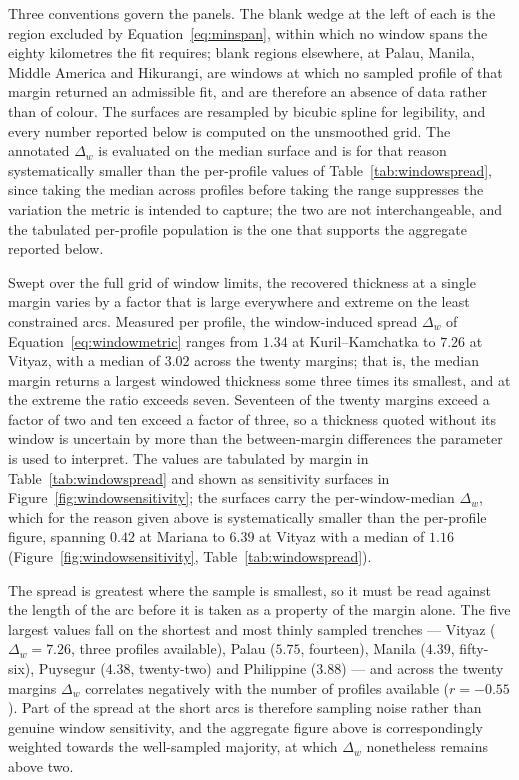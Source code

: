 \documentclass[final]{agujournal2019}
\begin{document}
Three conventions govern the panels. The blank wedge at the left of each is the
region excluded by Equation~\eqref{eq:minspan}, within which no window spans
the eighty kilometres the fit requires; blank regions elsewhere, at Palau,
Manila, Middle America and Hikurangi, are windows at which no sampled profile
of that margin returned an admissible fit, and are therefore an absence of data
rather than of colour. The surfaces are resampled by bicubic spline for
legibility, and every number reported below is computed on the unsmoothed grid.
The annotated $\Delta_{w}$ is evaluated on the median surface and is for that
reason systematically smaller than the per-profile values of
Table~\ref{tab:windowspread}, since taking the median across profiles before
taking the range suppresses the variation the metric is intended to capture;
the two are not interchangeable, and the tabulated per-profile population
is the one that supports the aggregate reported below.

Swept over the full grid of window limits, the recovered thickness at a single
margin varies by a factor that is large everywhere and extreme on the least
constrained arcs. Measured per profile, the window-induced spread
$\Delta_{w}$ of Equation~\eqref{eq:windowmetric} ranges from $1.34$ at
Kuril--Kamchatka to $7.26$ at Vityaz, with a median of $3.02$ across the twenty
margins; that is, the median margin returns a largest windowed thickness some
three times its smallest, and at the extreme the ratio exceeds seven. Seventeen
of the twenty margins exceed a factor of two and ten exceed a factor of three,
so a thickness quoted without its window is uncertain by more than the
between-margin differences the parameter is used to interpret. The values are
tabulated by margin in Table~\ref{tab:windowspread} and shown as sensitivity
surfaces in Figure~\ref{fig:windowsensitivity}; the surfaces carry the
per-window-median $\Delta_{w}$, which for the reason given above is
systematically smaller than the per-profile figure, spanning $0.42$ at Mariana
to $6.39$ at Vityaz with a median of $1.16$
(Figure~\ref{fig:windowsensitivity}, Table~\ref{tab:windowspread}).

The spread is greatest where the sample is smallest, so it must be read against
the length of the arc before it is taken as a property of the margin alone. The
five largest values fall on the shortest and most thinly sampled trenches ---
Vityaz ($\Delta_{w}=7.26$, three profiles available), Palau ($5.75$, fourteen),
Manila ($4.39$, fifty-six), Puysegur ($4.38$, twenty-two) and Philippine
($3.88$) --- and across the twenty margins $\Delta_{w}$ correlates negatively
with the number of profiles available ($r=-0.55$). Part of the spread at the
short arcs is therefore sampling noise rather than genuine window sensitivity,
and the aggregate figure above is correspondingly weighted towards the
well-sampled majority, at which $\Delta_{w}$ nonetheless remains above two.
\end{document}
